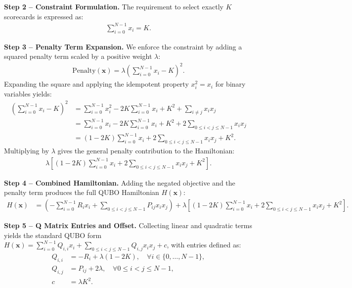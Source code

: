 \documentclass[12pt]{article}
\begin{document}
\textbf{Step 2 -- Constraint Formulation.} The requirement to select exactly $K$ scorecards is expressed as:
\begin{align}
    \sum_{i=0}^{N-1} x_i = K.
\end{align}

\textbf{Step 3 -- Penalty Term Expansion.} We enforce the constraint by adding a squared penalty term scaled by a positive weight $\lambda$:
\begin{align}
    \text{Penalty}(\mathbf{x}) = \lambda \left( \sum_{i=0}^{N-1} x_i - K \right)^2.
\end{align}
Expanding the square and applying the idempotent property $x_i^2 = x_i$ for binary variables yields:
\begin{align}
    \left( \sum_{i=0}^{N-1} x_i - K \right)^2 &= \sum_{i=0}^{N-1} x_i^2 - 2K \sum_{i=0}^{N-1} x_i + K^2 + \sum_{i \neq j} x_i x_j \\
    &= \sum_{i=0}^{N-1} x_i - 2K \sum_{i=0}^{N-1} x_i + K^2 + 2 \sum_{0 \leq i < j \leq N-1} x_i x_j \\
    &= (1 - 2K) \sum_{i=0}^{N-1} x_i + 2 \sum_{0 \leq i < j \leq N-1} x_i x_j + K^2.
\end{align}
Multiplying by $\lambda$ gives the general penalty contribution to the Hamiltonian:
\begin{align}
    \lambda \left[ (1 - 2K) \sum_{i=0}^{N-1} x_i + 2 \sum_{0 \leq i < j \leq N-1} x_i x_j + K^2 \right].
\end{align}

\textbf{Step 4 -- Combined Hamiltonian.} Adding the negated objective and the penalty term produces the full QUBO Hamiltonian $H(\mathbf{x})$:
\begin{align}
    H(\mathbf{x}) &= \left( -\sum_{i=0}^{N-1} R_i x_i + \sum_{0 \leq i < j \leq N-1} P_{ij} x_i x_j \right) + \lambda \left[ (1 - 2K) \sum_{i=0}^{N-1} x_i + 2 \sum_{0 \leq i < j \leq N-1} x_i x_j + K^2 \right].
\end{align}

\textbf{Step 5 -- Q Matrix Entries and Offset.} Collecting linear and quadratic terms yields the standard QUBO form $H(\mathbf{x}) = \sum_{i=0}^{N-1} Q_{i,i} x_i + \sum_{0 \leq i < j \leq N-1} Q_{i,j} x_i x_j + c$, with entries defined as:
\begin{align}
    Q_{i,i} &= -R_i + \lambda(1 - 2K), \quad \forall i \in \{0, \dots, N-1\}, \\
    Q_{i,j} &= P_{ij} + 2\lambda, \quad \forall 0 \leq i < j \leq N-1, \\
    c &= \lambda K^2.
\end{align}
\end{document}
